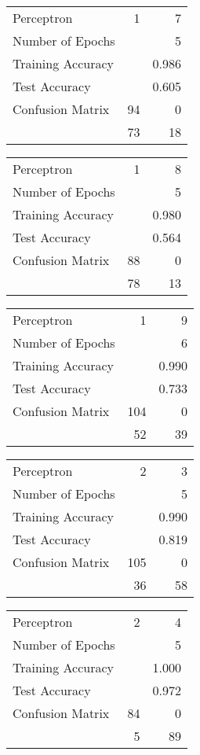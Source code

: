 \documentclass[11pt]{article}
\begin{document}
\begin{minipage}[t]{0.5\textwidth}
\begin{tabular}{|l | r r|}
\hline Perceptron & 1 & 7\\
Number of Epochs & & 5\\
Training Accuracy & & 0.986\\
Test Accuracy & & 0.605\\
Confusion Matrix & 94 & 0\\
 &73 & 18\\ \hline
\end{tabular}
\end{minipage}
\begin{minipage}[t]{0.5\textwidth}
\begin{tabular}{|l | r r|}
\hline Perceptron & 1 & 8\\
Number of Epochs & & 5\\
Training Accuracy & & 0.980\\
Test Accuracy & & 0.564\\
Confusion Matrix & 88 & 0\\
 &78 & 13\\ \hline
\end{tabular}
\end{minipage}
\begin{minipage}[t]{0.5\textwidth}
\begin{tabular}{|l | r r|}
\hline Perceptron & 1 & 9\\
Number of Epochs & & 6\\
Training Accuracy & & 0.990\\
Test Accuracy & & 0.733\\
Confusion Matrix & 104 & 0\\
 &52 & 39\\ \hline
\end{tabular}
\end{minipage}
\begin{minipage}[t]{0.5\textwidth}
\begin{tabular}{|l | r r|}
\hline Perceptron & 2 & 3\\
Number of Epochs & & 5\\
Training Accuracy & & 0.990\\
Test Accuracy & & 0.819\\
Confusion Matrix & 105 & 0\\
 &36 & 58\\ \hline
\end{tabular}
\end{minipage}
\begin{minipage}[t]{0.5\textwidth}
\begin{tabular}{|l | r r|}
\hline Perceptron & 2 & 4\\
Number of Epochs & & 5\\
Training Accuracy & & 1.000\\
Test Accuracy & & 0.972\\
Confusion Matrix & 84 & 0\\
 &5 & 89\\ \hline
\end{tabular}
\end{minipage}
\end{document}
